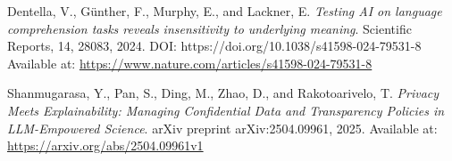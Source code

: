 \documentclass[11pt,a4paper]{article}
\begin{document}
\begin{thebibliography}{9}
		Dentella, V., Günther, F., Murphy, E., and Lackner, E.
		\textit{Testing AI on language comprehension tasks reveals insensitivity to underlying meaning}.
		Scientific Reports, 14, 28083, 2024.
		DOI: https://doi.org/10.1038/s41598-024-79531-8
		Available at: \url{https://www.nature.com/articles/s41598-024-79531-8}

		Shanmugarasa, Y., Pan, S., Ding, M., Zhao, D., and Rakotoarivelo, T.
		\textit{Privacy Meets Explainability: Managing Confidential Data and Transparency Policies in LLM-Empowered Science}.
		arXiv preprint arXiv:2504.09961, 2025.
		Available at: \url{https://arxiv.org/abs/2504.09961v1}

	\end{thebibliography}
	
\end{document}
